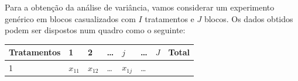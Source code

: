 \documentclass[
]{book}
\begin{document}
Para a obtenção da análise de variância, vamos considerar um experimento genérico em blocos casualizados com \(I\) tratamentos e \(J\) blocos. Os dados obtidos podem ser dispostos num quadro como o seguinte:

\begin{longtable}[]{@{}llllllll@{}}
\toprule
\begin{minipage}[b]{0.33\columnwidth}\raggedright
Tratamentos\strut
\end{minipage} & \begin{minipage}[b]{0.03\columnwidth}\raggedright
1\strut
\end{minipage} & \begin{minipage}[b]{0.03\columnwidth}\raggedright
2\strut
\end{minipage} & \begin{minipage}[b]{0.09\columnwidth}\raggedright
\ldots{}\strut
\end{minipage} & \begin{minipage}[b]{0.03\columnwidth}\raggedright
\(j\)\strut
\end{minipage} & \begin{minipage}[b]{0.09\columnwidth}\raggedright
\ldots{}\strut
\end{minipage} & \begin{minipage}[b]{0.03\columnwidth}\raggedright
\(J\)\strut
\end{minipage} & \begin{minipage}[b]{0.15\columnwidth}\raggedright
Total\strut
\end{minipage}\tabularnewline
\midrule
\endhead
\begin{minipage}[t]{0.33\columnwidth}\raggedright
1\strut
\end{minipage} & \begin{minipage}[t]{0.03\columnwidth}\raggedright
\(x_{11}\)\strut
\end{minipage} & \begin{minipage}[t]{0.03\columnwidth}\raggedright
\(x_{12}\)\strut
\end{minipage} & \begin{minipage}[t]{0.09\columnwidth}\raggedright
\ldots{}\strut
\end{minipage} & \begin{minipage}[t]{0.03\columnwidth}\raggedright
\(x_{1j}\)\strut
\end{minipage} & \begin{minipage}[t]{0.09\columnwidth}\raggedright
\ldots{}\strut
\end{minipage} & \begin{minipage}[t]{0.03\columnwidth}\raggedright

\end{minipage}
\end{longtable}
\end{document}
